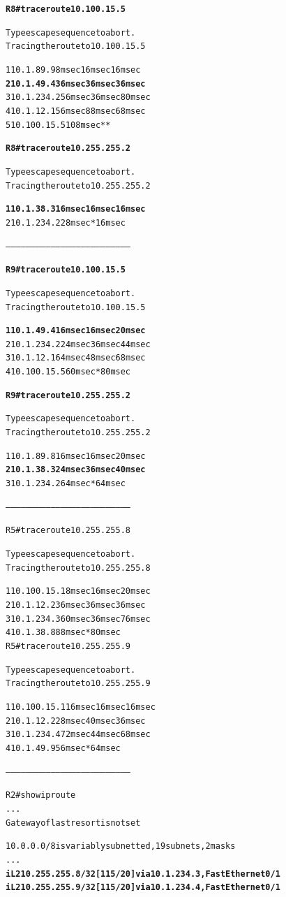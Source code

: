 \documentclass[12pt,twoside,a4paper]{report}
\begin{document}
\noindent
{\selectfont
\begin{small}
\begin{alltt}
\textbf{R8#traceroute 10.100.15.5}

Type escape sequence to abort.
Tracing the route to 10.100.15.5

  1 10.1.89.9 8 msec 16 msec 16 msec
\textbf{  2 10.1.49.4 36 msec 36 msec 36 msec}
  3 10.1.234.2 56 msec 36 msec 80 msec
  4 10.1.12.1 56 msec 88 msec 68 msec
  5 10.100.15.5 108 msec *  * 




\textbf{R8#traceroute 10.255.255.2}

Type escape sequence to abort.
Tracing the route to 10.255.255.2

\textbf{  1 10.1.38.3 16 msec 16 msec 16 msec}
  2 10.1.234.2 28 msec *  16 msec


--------------------------------------------------------------------------


\textbf{R9#traceroute 10.100.15.5}

Type escape sequence to abort.
Tracing the route to 10.100.15.5

\textbf{  1 10.1.49.4 16 msec 16 msec 20 msec}
  2 10.1.234.2 24 msec 36 msec 44 msec
  3 10.1.12.1 64 msec 48 msec 68 msec
  4 10.100.15.5 60 msec *  80 msec




\textbf{R9#traceroute 10.255.255.2}

Type escape sequence to abort.
Tracing the route to 10.255.255.2

  1 10.1.89.8 16 msec 16 msec 20 msec
\textbf{  2 10.1.38.3 24 msec 36 msec 40 msec}
  3 10.1.234.2 64 msec *  64 msec


--------------------------------------------------------------------------


R5#traceroute 10.255.255.8

Type escape sequence to abort.
Tracing the route to 10.255.255.8

  1 10.100.15.1 8 msec 16 msec 20 msec
  2 10.1.12.2 36 msec 36 msec 36 msec
  3 10.1.234.3 60 msec 36 msec 76 msec
  4 10.1.38.8 88 msec *  80 msec
R5#traceroute 10.255.255.9

Type escape sequence to abort.
Tracing the route to 10.255.255.9

  1 10.100.15.1 16 msec 16 msec 16 msec
  2 10.1.12.2 28 msec 40 msec 36 msec
  3 10.1.234.4 72 msec 44 msec 68 msec
  4 10.1.49.9 56 msec *  64 msec


--------------------------------------------------------------------------


R2#show ip route
...
Gateway of last resort is not set

     10.0.0.0/8 is variably subnetted, 19 subnets, 2 masks
...
\textbf{i L2    10.255.255.8/32 [115/20] via 10.1.234.3, FastEthernet0/1}
\textbf{i L2    10.255.255.9/32 [115/20] via 10.1.234.4, FastEthernet0/1}
\end{alltt}
\end{small}
}
\end{document}
